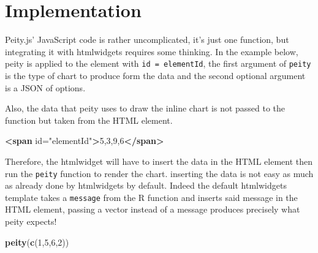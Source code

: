 \documentclass[
]{krantz}
\makeatletter
\newenvironment{Shaded}{\begin{snugshade}}{\end{snugshade}}
\newcommand{\DataTypeTok}[1]{\textcolor[rgb]{0.27,0.27,0.27}{#1}}
\newcommand{\DecValTok}[1]{\textcolor[rgb]{0.06,0.06,0.06}{#1}}
\newcommand{\FunctionTok}[1]{\textcolor[rgb]{0,0,0}{#1}}
\newcommand{\KeywordTok}[1]{\textcolor[rgb]{0.27,0.27,0.27}{\textbf{#1}}}
\newcommand{\NormalTok}[1]{#1}
\newcommand{\OperatorTok}[1]{\textcolor[rgb]{0.43,0.43,0.43}{\textbf{#1}}}
\newcommand{\OtherTok}[1]{\textcolor[rgb]{0.37,0.37,0.37}{#1}}
\newcommand{\StringTok}[1]{\textcolor[rgb]{0.5,0.5,0.5}{#1}}
\newenvironment{kframe}{%
\medskip{}
\setlength{\fboxsep}{.8em}
 \def\at@end@of@kframe{}%
 \ifinner\ifhmode%
  \def\at@end@of@kframe{\end{minipage}}%
  \begin{minipage}{\columnwidth}%
 \fi\fi%
 \def\FrameCommand##1{\hskip\@totalleftmargin \hskip-\fboxsep
 \colorbox{shadecolor}{##1}\hskip-\fboxsep
     \hskip-\linewidth \hskip-\@totalleftmargin \hskip\columnwidth}%
 \MakeFramed {\advance\hsize-\width
   \@totalleftmargin\z@ \linewidth\hsize
   \@setminipage}}%
 {\par\unskip\endMakeFramed%
 \at@end@of@kframe}
\renewenvironment{Shaded}{\begin{kframe}}{\end{kframe}}
\makeatother
\begin{document}
\hypertarget{widgets-realistic-implementation}{%
\section{Implementation}\label{widgets-realistic-implementation}}

Peity.js' JavaScript code is rather uncomplicated, it's just one function, but integrating it with htmlwidgets requires some thinking. In the example below, peity is applied to the element with \texttt{id\ =\ \textquotesingle{}elementId\textquotesingle{}}, the first argument of \texttt{peity} is the type of chart to produce form the data and the second optional argument is a JSON of options.

\begin{Shaded}
\end{Shaded}

Also, the data that peity uses to draw the inline chart is not passed to the function but taken from the HTML element.

\begin{Shaded}
\begin{Highlighting}[]
\KeywordTok{\textless{}span}\OtherTok{ id=}\StringTok{"elementId"}\KeywordTok{\textgreater{}}\NormalTok{5,3,9,6}\KeywordTok{\textless{}/span\textgreater{}}
\end{Highlighting}
\end{Shaded}

Therefore, the htmlwidget will have to insert the data in the HTML element then run the \texttt{peity} function to render the chart. inserting the data is not easy as much as already done by htmlwidgets by default. Indeed the default htmlwidgets template takes a \texttt{message} from the R function and inserts said message in the HTML element, passing a vector instead of a message produces precisely what peity expects!

\begin{Shaded}
\begin{Highlighting}[]
\KeywordTok{peity}\NormalTok{(}\KeywordTok{c}\NormalTok{(}\DecValTok{1}\NormalTok{,}\DecValTok{5}\NormalTok{,}\DecValTok{6}\NormalTok{,}\DecValTok{2}\NormalTok{))}
\end{Highlighting}
\end{Shaded}
\end{document}
